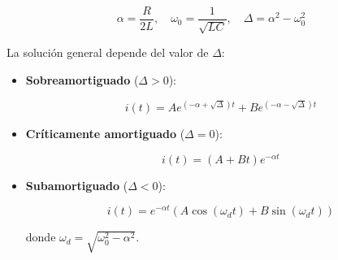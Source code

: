 \documentclass{article}
\begin{document}
\begin{equation}
\alpha = \frac{R}{2L}, \quad \omega_0 = \frac{1}{\sqrt{LC}}, \quad \Delta = \alpha^2 - \omega_0^2
\end{equation}

La solución general depende del valor de \( \Delta \):

\begin{itemize}
  \item \textbf{Sobreamortiguado} (\( \Delta > 0 \)):

  \begin{equation}
  i(t) = A e^{(-\alpha + \sqrt{\Delta})t} + B e^{(-\alpha - \sqrt{\Delta})t}
  \end{equation}

  \item \textbf{Críticamente amortiguado} (\( \Delta = 0 \)):

  \begin{equation}
  i(t) = (A + Bt)e^{-\alpha t}
  \end{equation}

  \item \textbf{Subamortiguado} (\( \Delta < 0 \)):

  \begin{equation}
  i(t) = e^{-\alpha t} \left( A \cos(\omega_d t) + B \sin(\omega_d t) \right)
  \end{equation}

  donde \( \omega_d = \sqrt{\omega_0^2 - \alpha^2} \).
\end{itemize}
\end{document}
